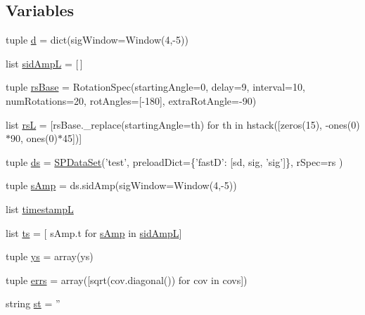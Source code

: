 \subsection*{Variables}
\begin{DoxyCompactItemize}
\item 
tuple \hyperlink{namespacerepo_1_1programs_1_1pythonpackages_1_1pr_1_1SPDataSet_ae71666498d0f08a9d2c39f65c8be15e1}{d} = dict(sig\-Window=Window(4,-\/5))
\item 
list \hyperlink{namespacerepo_1_1programs_1_1pythonpackages_1_1pr_1_1SPDataSet_aaa1cf30f24f4635798c2ac9ab8cb991f}{sid\-Amp\-L} = \mbox{[}$\,$\mbox{]}
\item 
tuple \hyperlink{namespacerepo_1_1programs_1_1pythonpackages_1_1pr_1_1SPDataSet_a6b49ba99ee674be07d78e57e0d6a4506}{rs\-Base} = Rotation\-Spec(starting\-Angle=0, delay=9, interval=10, num\-Rotations=20, rot\-Angles=\mbox{[}-\/180\mbox{]}, extra\-Rot\-Angle=-\/90)
\item 
list \hyperlink{namespacerepo_1_1programs_1_1pythonpackages_1_1pr_1_1SPDataSet_a794711a619d88291abbe1c9c29396b5b}{rs\-L} = \mbox{[}rs\-Base.\-\_\-replace(starting\-Angle=th) for th in hstack(\mbox{[}zeros(15), -\/ones(0)$\ast$90, ones(0)$\ast$45\mbox{]})\mbox{]}
\item 
tuple \hyperlink{namespacerepo_1_1programs_1_1pythonpackages_1_1pr_1_1SPDataSet_a9dcba74d2fb20a6a41c191302ec5136b}{ds} = \hyperlink{classrepo_1_1programs_1_1pythonpackages_1_1pr_1_1SPDataSet_1_1SPDataSet}{S\-P\-Data\-Set}('test', preload\-Dict=\{'fast\-D'\-: \mbox{[}sd, sig, 'sig'\mbox{]}\}, r\-Spec=rs )
\item 
tuple \hyperlink{namespacerepo_1_1programs_1_1pythonpackages_1_1pr_1_1SPDataSet_a7ef84c87edaf55c60c75aa4a6b63fabf}{s\-Amp} = ds.\-sid\-Amp(sig\-Window=Window(4,-\/5))
\item 
list \hyperlink{namespacerepo_1_1programs_1_1pythonpackages_1_1pr_1_1SPDataSet_ab977d64bf78ed1ce32101398d66e2673}{timestamp\-L}
\item 
list \hyperlink{namespacerepo_1_1programs_1_1pythonpackages_1_1pr_1_1SPDataSet_a2e421078d46e1d8f3b0c2d7c8211e1a2}{ts} = \mbox{[} s\-Amp.\-t for \hyperlink{namespacerepo_1_1programs_1_1pythonpackages_1_1pr_1_1SPDataSet_a7ef84c87edaf55c60c75aa4a6b63fabf}{s\-Amp} in \hyperlink{namespacerepo_1_1programs_1_1pythonpackages_1_1pr_1_1SPDataSet_aaa1cf30f24f4635798c2ac9ab8cb991f}{sid\-Amp\-L}\mbox{]}
\item 
tuple \hyperlink{namespacerepo_1_1programs_1_1pythonpackages_1_1pr_1_1SPDataSet_af4556d66bac96baab9aed887e66ce083}{ys} = array(ys)
\item 
tuple \hyperlink{namespacerepo_1_1programs_1_1pythonpackages_1_1pr_1_1SPDataSet_a3c7145cc42e7ec16a596f5996a8e70e2}{errs} = array(\mbox{[}sqrt(cov.\-diagonal()) for cov in covs\mbox{]})
\item 
string \hyperlink{namespacerepo_1_1programs_1_1pythonpackages_1_1pr_1_1SPDataSet_aa809f797a727977783e89201eb7515ba}{st} = ''
\end{DoxyCompactItemize}


